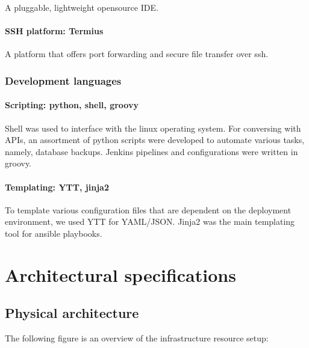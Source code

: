 A pluggable, lightweight opensource IDE. 

\paragraph{SSH platform: Termius }

A platform that offers port forwarding and secure file transfer over ssh. 

\subsubsection{Development languages }

\paragraph{Scripting: python, shell, groovy }

Shell was used to interface with the linux operating system. For conversing with APIs, an assortment of python scripts were developed to automate various tasks, namely, database backups. Jenkins pipelines and configurations were written in groovy. 

\paragraph{Templating: YTT, jinja2 }

To template various configuration files that are dependent on the deployment environment, we used YTT for YAML/JSON. Jinja2 was the main templating tool for ansible playbooks. 

\section{Architectural specifications}

\subsection{Physical architecture}

The following figure is an overview of the infrastructure resource setup:

